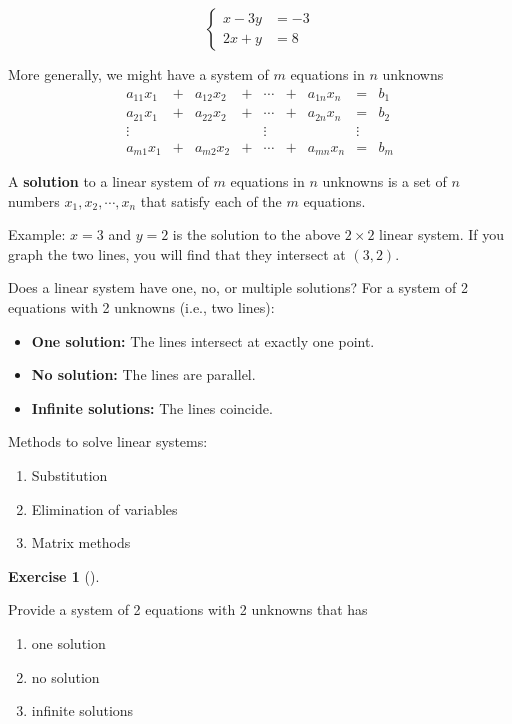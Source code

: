 \documentclass[
  letterpaper,
]{book}
\providecommand{\tightlist}{%
  \setlength{\itemsep}{0pt}\setlength{\parskip}{0pt}}\usepackage{longtable,booktabs,array}
\theoremstyle{definition}
\theoremstyle{definition}
\theoremstyle{plain}
\theoremstyle{definition}
\newtheorem{exercise}{Exercise}[chapter]
\theoremstyle{plain}
\theoremstyle{plain}
\theoremstyle{remark}
\begin{document}
\[\left\{\begin{array}{ll} x-3y &= -3\\ 2x +y &= 8 \end{array}\right.\]

More generally, we might have a system of \(m\) equations in \(n\)
unknowns \[\begin{matrix}
        a_{11}x_1  & + & a_{12}x_2 & + & \cdots & + & a_{1n}x_n & = & b_1\\
        a_{21}x_1  & + & a_{22}x_2 & + & \cdots & + & a_{2n}x_n & = & b_2\\
        \vdots     &   &     &   & \vdots &   &     & \vdots & \\
        a_{m1}x_1  & + & a_{m2}x_2 & + & \cdots & + & a_{mn}x_n & = & b_m
        \end{matrix}\]

A \textbf{solution} to a linear system of \(m\) equations in \(n\)
unknowns is a set of \(n\) numbers \(x_1, x_2, \cdots, x_n\) that
satisfy each of the \(m\) equations.

Example: \(x=3\) and \(y=2\) is the solution to the above \(2\times 2\)
linear system. If you graph the two lines, you will find that they
intersect at \((3,2)\).

Does a linear system have one, no, or multiple solutions? For a system
of 2 equations with 2 unknowns (i.e., two lines):

\begin{itemize}
\tightlist
\item
  \textbf{One solution:} The lines intersect at exactly one point.
\item
  \textbf{No solution:} The lines are parallel.
\item
  \textbf{Infinite solutions:} The lines coincide.
\end{itemize}

Methods to solve linear systems:

\begin{enumerate}
\def\labelenumi{\arabic{enumi}.}
\tightlist
\item
  Substitution
\item
  Elimination of variables
\item
  Matrix methods
\end{enumerate}

\leavevmode{}%
\begin{exercise}[]\label{exr-lineareq}

Provide a system of 2 equations with 2 unknowns that has

\begin{enumerate}
\def\labelenumi{\arabic{enumi}.}
\tightlist
\item
  one solution
\item
  no solution
\item
  infinite solutions
\end{enumerate}

\end{exercise}
\end{document}

